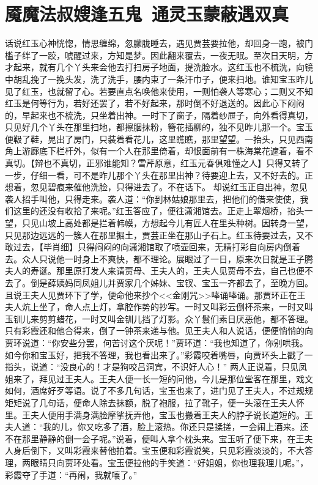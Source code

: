 \documentclass[12pt,oneside]{book}
\begin{document}
 
\chapter{魇魔法叔嫂逢五鬼~通灵玉蒙蔽遇双真}
话说红玉心神恍惚，情思缠绵，忽朦胧睡去，遇见贾芸要拉他，却回身一跑，被门槛子绊了一跤，唬醒过来，方知是梦。因此翻来覆去，一夜无眠。至次日天明，方才起来，就有几个丫头来会他去打扫房子地面，提洗脸水。这红玉也不梳洗，向镜中胡乱挽了一挽头发，洗了洗手，腰内束了一条汗巾子，便来扫地。谁知宝玉昨儿见了红玉，也就留了心。若要直点名唤他来使用，一则怕袭人等寒心；二则又不知红玉是何等行为，若好还罢了，若不好起来，那时倒不好退送的。因此心下闷闷的，早起来也不梳洗，只坐着出神。一时下了窗子，隔着纱屉子，向外看得真切，只见好几个丫头在那里扫地，都擦胭抹粉，簪花插柳的，独不见昨儿那一个。宝玉便靸了鞋，晃出了房门，只装着看花儿，这里瞧瞧，那里望望。一抬头，只见西南角上游廊底下栏杆外，似有一个人在那里倚着，却恨面前有一株海棠花遮着，看不真切。【辩也不真切，正邪谁能知？雪芹原意，红玉元春俱难懂之人】只得又转了一步，仔细一看，可不是昨儿那个丫头在那里出神？待要迎上去，又不好去的。正想着，忽见碧痕来催他洗脸，只得进去了。不在话下。
却说红玉正自出神，忽见袭人招手叫他，只得走来。袭人道：“你到林姑娘那里去，把他们的借来使使，我们这里的还没有收拾了来呢。”红玉答应了，便往潇湘馆去。正走上翠烟桥，抬头一望，只见山坡上高处都是拦着帏幙，方想起今儿有匠人在里头种树。因转身一望，只见那边远远的一簇人在那里掘土，贾芸正坐在那山子石上。红玉待要过去，又不敢过去，【毕肖细】只得闷闷的向潇湘馆取了喷壶回来，无精打彩自向房内倒着去。众人只说他一时身上不爽快，都不理论。展眼过了一日，原来次日就是王子腾夫人的寿诞。那里原打发人来请贾母、王夫人的，王夫人见贾母不去，自己也便不去了。倒是薛姨妈同凤姐儿并贾家几个姊妹、宝钗、宝玉一齐都去了，至晚方回。
且说王夫人见贾环下了学，便命他来抄个<<金刚咒>>唪诵唪诵。那贾环正在王夫人炕上坐了，命人点上灯，拿腔作势的抄写。一时又叫彩云倒杯茶来，一时又叫玉钏儿来剪剪蜡花，一时又叫金钏儿挡了灯影。众丫鬟们素日厌恶他，都不答理。只有彩霞还和他合得来，倒了一钟茶来递与他。见王夫人和人说话，便便悄悄的向贾环说道：“你安些分罢，何苦讨这个厌呢！”贾环道：“我也知道了，你别哄我。如今你和宝玉好，把我不答理，我也看出来了。”彩霞咬着嘴唇，向贾环头上戳了一指头，说道：“没良心的！才是狗咬吕洞宾，不识好人心！”
两人正说着，只见凤姐来了，拜见过王夫人。王夫人便一长一短的问他，今儿是那位堂客在那里，戏文如何，酒席好歹等语。说了不多几句话，宝玉也来了，进门见了王夫人，不过规规矩矩说了几句话，便命人除去抹额，脱了袍服，拉了靴子，便一头滚在王夫人怀里。王夫人便用手满身满脸摩挲抚弄他，宝玉也搬着王夫人的脖子说长道短的。王夫人道：“我的儿，你又吃多了酒，脸上滚热。你还只是揉搓，一会闹上酒来。还不在那里静静的倒一会子呢。”说着，便叫人拿个枕头来。宝玉听了便下来，在王夫人身后倒下，又叫彩霞来替他拍着。宝玉便和彩霞说笑，只见彩霞淡淡的，不大答理，两眼睛只向贾环处看。宝玉便拉他的手笑道：“好姐姐，你也理我理儿呢。”，彩霞夺了手道：“再闹，我就嚷了。”
\end{document}
